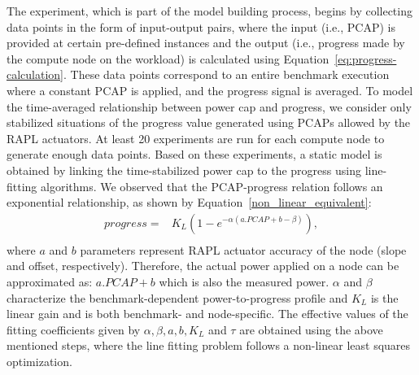 The experiment, which is part of the model building process, begins by collecting data points in the form of input-output pairs, where the input (i.e., PCAP) is provided at certain pre-defined instances and the output (i.e., progress made by the compute node on the workload) is calculated using Equation~\eqref{eq:progress-calculation}. 
These data points correspond to an entire benchmark execution where a constant PCAP is applied, and the progress signal is averaged. To model the time-averaged relationship between power cap and progress, we consider only stabilized situations of the progress value generated using PCAPs allowed by the RAPL actuators. At least 20 experiments are run for each compute node to generate enough data points. Based on these experiments, a static model is obtained by linking the time-stabilized power cap to the progress using line-fitting algorithms. We observed that the PCAP-progress relation follows an exponential relationship, as shown by Equation~\eqref{non_linear_equivalent}:
\begin{equation}
    \begin{aligned}
          progress = & K_{L}(1-e^{-\alpha(a.PCAP+b-\beta)}),\\
    \end{aligned}
    \label{non_linear_equivalent}
\end{equation}
where $a$ and $b$ parameters represent RAPL actuator accuracy of the node (slope and offset, respectively). Therefore, the actual power applied on a node can be approximated as: $a.PCAP + b$ which is also the measured power. $\alpha$ and $\beta$ characterize the benchmark-dependent power-to-progress profile and $K_L$ is the linear gain and is both benchmark- and node-specific. The effective values of the fitting coefficients given by $\alpha, \beta, a, b, K_L$ and $ \tau $ are obtained using the above mentioned steps, where the line fitting problem follows a non-linear least squares optimization.
